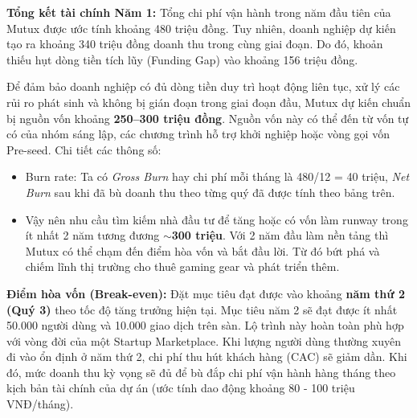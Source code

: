 \textbf{Tổng kết tài chính Năm 1:} 
Tổng chi phí vận hành trong năm đầu tiên của Mutux được ước tính khoảng 480 triệu đồng. Tuy nhiên, doanh nghiệp dự kiến tạo ra khoảng 340 triệu đồng doanh thu trong cùng giai đoạn. Do đó, khoản thiếu hụt dòng tiền tích lũy (Funding Gap) vào khoảng 156 triệu đồng.

Để đảm bảo doanh nghiệp có đủ dòng tiền duy trì hoạt động liên tục, xử lý các rủi ro phát sinh và không bị gián đoạn trong giai đoạn đầu, Mutux dự kiến chuẩn bị nguồn vốn khoảng \textbf{250--300 triệu đồng}. Nguồn vốn này có thể đến từ vốn tự có của nhóm sáng lập, các chương trình hỗ trợ khởi nghiệp hoặc vòng gọi vốn Pre-seed. Chi tiết các thông số:
\begin{itemize}
    \item Burn rate: Ta có \textit{Gross Burn} hay chi phí mỗi tháng là 480/12 = 40 triệu, \textit{Net Burn} sau khi đã bù doanh thu theo từng quý đã được tính theo bảng trên.
    \item Vậy nên nhu cầu tìm kiếm nhà đầu tư để tăng hoặc có vốn làm runway trong ít nhất 2 năm tương đương \textbf{$\sim$300 triệu}. Với 2 năm đầu làm nền tảng thì Mutux có thể chạm đến điểm hòa vốn và bắt đầu lời. Từ đó bứt phá và chiếm lĩnh thị trường cho thuê gaming gear và phát triển thêm.
\end{itemize}

\textbf{Điểm hòa vốn (Break-even):} 
Đặt mục tiêu đạt được vào khoảng \textbf{năm thứ 2 (Quý 3)} theo tốc độ tăng trưởng hiện tại. Mục tiêu năm 2 sẽ đạt được ít nhất 50.000 người dùng và 10.000 giao dịch trên sàn. Lộ trình này hoàn toàn phù hợp với vòng đời của một Startup Marketplace. Khi lượng người dùng thường xuyên đi vào ổn định ở năm thứ 2, chi phí thu hút khách hàng (CAC) sẽ giảm dần. Khi đó, mức doanh thu kỳ vọng sẽ đủ để bù đắp chi phí vận hành hàng tháng theo kịch bản tài chính của dự án (ước tính dao động khoảng 80 - 100 triệu VNĐ/tháng).

